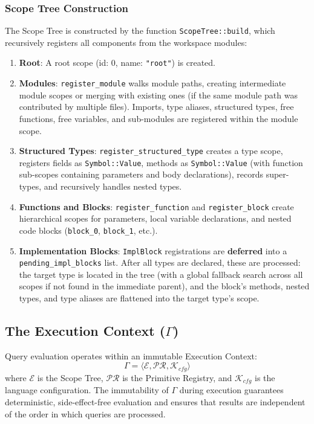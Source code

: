 \subsubsection{Scope Tree Construction}

The Scope Tree is constructed by the function
\texttt{ScopeTree::build}, which recursively registers all components
from the workspace modules:

\begin{enumerate}
  \item \textbf{Root}: A root scope (id: 0, name: \texttt{"root"}) is created.
  \item \textbf{Modules}: \texttt{register\_module} walks module
    paths, creating intermediate module scopes or merging with
    existing ones (if the same module path was contributed by
    multiple files). Imports, type aliases, structured types, free
    functions, free variables, and sub-modules are registered within
    the module scope.
  \item \textbf{Structured Types}:
    \texttt{register\_structured\_type} creates a type scope,
    registers fields as \texttt{Symbol::Value}, methods as
    \texttt{Symbol::Value} (with function sub-scopes containing
    parameters and body declarations), records super-types, and
    recursively handles nested types.
  \item \textbf{Functions and Blocks}: \texttt{register\_function}
    and \texttt{register\_block} create hierarchical scopes for
    parameters, local variable declarations, and nested code blocks
    (\texttt{block\_0}, \texttt{block\_1}, etc.).
  \item \textbf{Implementation Blocks}: \texttt{ImplBlock}
    registrations are \textbf{deferred} into a
    \texttt{pending\_impl\_blocks} list. After all types are
    declared, these are processed: the target type is located in the
    tree (with a global fallback search across all scopes if not
    found in the immediate parent), and the block's methods, nested
    types, and type aliases are flattened into the target type's scope.
\end{enumerate}

\subsection{The Execution Context ($\Gamma$)}

Query evaluation operates within an immutable Execution Context:
$$\Gamma = \langle \mathcal{E}, \mathcal{PR}, \mathcal{K}_{cfg} \rangle$$
where $\mathcal{E}$ is the Scope Tree, $\mathcal{PR}$ is the
Primitive Registry, and $\mathcal{K}_{cfg}$ is the language
configuration. The immutability of $\Gamma$ during execution
guarantees deterministic, side-effect-free evaluation and ensures
that results are independent of the order in which queries are processed.


